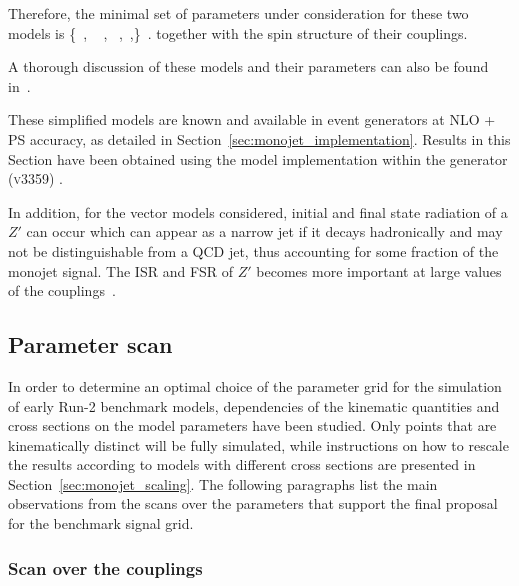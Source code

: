 Therefore, the minimal set of parameters under consideration for these two models is
\bea
\left\{~\gq, ~ \gDM, ~\mDM,~\mMed,\right\} \,.
\eea
together with the spin structure of their couplings. 

A thorough discussion of these models and their parameters can also be found in~\cite{Buchmueller:2014yoa}.
 

These simplified models are known and available in event generators at NLO + PS accuracy, as detailed in Section~\ref{sec:monojet_implementation}. 
Results in this Section have been obtained using the model implementation within the \powheg generator (\textsc{v3359}) \cite{Haisch:2013ata}.

In addition, for the vector models considered, initial and final state radiation of a $Z'$ can occur which can appear as a narrow jet if it decays hadronically and may not be distinguishable from a QCD jet, thus accounting for some fraction of the monojet signal. The ISR and FSR of $Z'$ becomes more important at large values of the couplings~\cite{Bai:2015nfa}. 

\subsection{Parameter scan}
\label{sub:parameter_scan_monojet}

In order to determine an optimal choice of the parameter grid for the simulation of early Run-2 benchmark models, dependencies of the kinematic quantities and cross sections on the model parameters have been studied. Only points that are kinematically distinct will be fully simulated, while instructions on how to rescale the results according to models with different cross sections are presented in Section~\ref{sec:monojet_scaling}. The following paragraphs list the main observations from the scans over the parameters that support the final proposal for the benchmark signal grid.

\subsubsection{Scan over the couplings}

